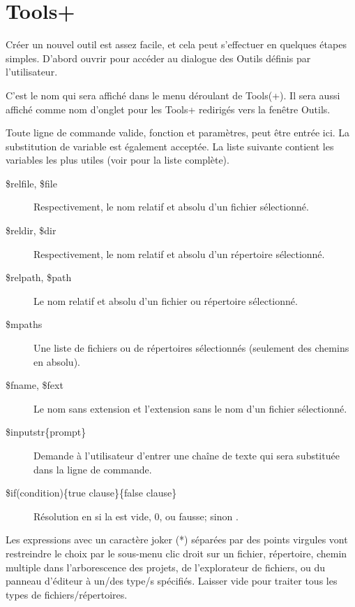 \section{Tools+}\label{sec:tools+}

Créer un nouvel outil est assez facile, et cela peut s'effectuer en quelques étapes simples. D'abord ouvrir  pour accéder au dialogue des Outils définis par l'utilisateur.



C'est le nom qui sera affiché dans le menu déroulant de Tools(+). Il sera aussi affiché comme nom d'onglet pour les Tools+ redirigés vers la fenêtre Outils.


Toute ligne de commande valide, fonction et paramètres, peut être entrée ici. La substitution de variable est également acceptée. La liste suivante contient les variables les plus utiles (voir  pour la liste complète).

\begin{description}
\item[\$relfile, \$file] Respectivement, le nom relatif et absolu d'un fichier sélectionné.
\item[\$reldir, \$dir] Respectivement, le nom relatif et absolu d'un répertoire sélectionné.
\item[\$relpath, \$path] Le nom relatif et absolu d'un fichier ou répertoire sélectionné.
\item[\$mpaths] Une liste de fichiers ou de répertoires sélectionnés (seulement des chemins en absolu).
\item[\$fname, \$fext] Le nom sans extension et l'extension sans le nom d'un fichier sélectionné.
\item[\$inputstr\{prompt\}] Demande à l'utilisateur d'entrer une chaîne de texte qui sera substituée dans la ligne de commande.
\item[\$if(condition)\{true clause\}\{false clause\}] Résolution en  si la  est vide, 0, ou fausse; sinon .
\end{description}


Les expressions avec un caractère joker (*) séparées par des points virgules vont restreindre le choix par le sous-menu clic droit sur un fichier, répertoire, chemin multiple dans l'arborescence des projets, de l'explorateur de fichiers, ou du panneau d'éditeur à un/des type/s spécifiés. Laisser vide pour traiter tous les types de fichiers/répertoires.

